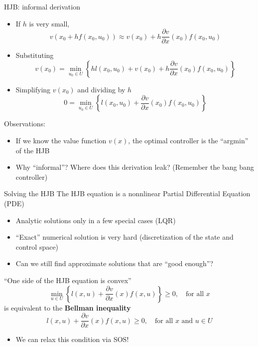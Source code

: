 \documentclass[aspectratio=169]{beamer}
\begin{document}
\begin{frame}{HJB: informal derivation}
\begin{itemize}
\item
If $h$ is very small,
$$
v(x_0 + h f(x_0, u_0)) \approx v(x_0) + h \frac{\partial v}{\partial x} (x_0) f(x_0, u_0)
$$
\item
Substituting
$$
v(x_0) = \min_{u_0 \in U} \left\{ h l(x_0, u_0) +  v(x_0) + h \frac{\partial v}{\partial x} (x_0) f(x_0, u_0) \right\}
$$
\item
Simplifying $v(x_0)$ and dividing by $h$
$$
0 = \min_{u_0 \in U} \left\{ l(x_0, u_0) + \frac{\partial v}{\partial x} (x_0) f(x_0, u_0) \right\}
$$
\end{itemize}
Observations:
\begin{itemize}
\item
If we know the value function $v(x)$, the optimal controller is the ``argmin'' of the HJB
\item
Why ``informal''? Where does this derivation leak? (Remember the bang bang controller)
\end{itemize}
\end{frame}

\begin{frame}{Solving the HJB}
The HJB equation is a nonnlinear Partial Differential Equation (PDE)
\begin{itemize}
\item
Analytic solutions only in a few special cases (LQR)
\item
``Exact'' numerical solution is very hard (discretization of the state and control space)
\item
Can we still find approximate solutions that are ``good enough''?
\end{itemize}

\begin{block}{``One side of the HJB equation is convex''}
$$
\min_{u \in U} \left\{ l(x, u) + \frac{\partial v}{\partial x} (x) f(x, u) \right\} \geq 0, \quad \text{for all } x
$$
is equivalent to the \textbf{Bellman inequality}
$$
l(x, u) + \frac{\partial v}{\partial x} (x) f(x, u) \geq 0, \quad \text{for all } x \text{ and } u \in U
$$
\vspace{-5mm}
\begin{itemize}
\item
We can relax this condition via SOS!
\end{itemize}
\end{block}
\end{frame}
\end{document}
